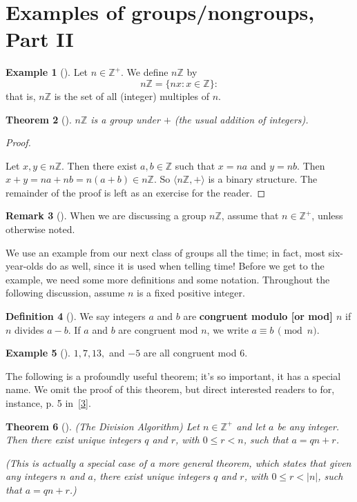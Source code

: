 \documentclass[10pt,]{book}
\newcommand{\terminology}[1]{\textbf{#1}}
\theoremstyle{plain}
\newtheorem{theorem}{Theorem}[section]
\theoremstyle{definition}
\newtheorem{definition}[theorem]{Definition}
\theoremstyle{definition}
\newtheorem{remark}[theorem]{Remark}
\theoremstyle{definition}
\newtheorem{example}[theorem]{Example}
\theoremstyle{definition}
\numberwithin{equation}{section}
\def\Z{\mathbb{Z}}
\newcommand{\lt}{<}
\begin{document}
\section[{Examples of groups/nongroups, Part II}]{Examples of groups/nongroups, Part II}\label{section-8}
\begin{example}[]\label{example-14}
Let \(n\in \Z^+\). We define \(n\Z\) by%
\begin{equation*}
n\Z=\{nx: x\in \Z\}:
\end{equation*}
that is, \(n\Z\) is the set of all (integer) multiples of \(n\).%
\end{example}
\begin{theorem}[{}]\label{nz}
\(n\Z\) is a group under \(+\) (the usual addition of integers).%
\end{theorem}
\begin{proof}\hypertarget{proof-13}{}
Let \(x, y\in n\Z\). Then there exist \(a,b\in \Z\) such that \(x=na\) and \(y=nb\). Then \(x+y=na+nb=n(a+b)\in n\Z\). So \(\langle n\Z,+\rangle\) is a binary structure. The remainder of the proof is left as an exercise for the reader.%
\end{proof}
\begin{remark}[]\label{remark-12}
When we are discussing a group \(n\Z\), assume that \(n\in \Z^+\), unless otherwise noted.%
\end{remark}
We use an example from our next class of groups all the time; in fact, most six-year-olds do as well, since it is used when telling time! Before we get to the example, we need some more definitions and some notation. Throughout the following discussion, assume \(n\) is a fixed positive integer.%
\begin{definition}[{}]\label{definition-23}
We say integers \(a\) and \(b\) are \terminology{congruent modulo [or mod] \(n\)} if \(n\) divides \(a-b\). If \(a\) and \(b\) are congruent mod \(n\), we write \(a \equiv b\, \pmod{n}\).%
\end{definition}
\begin{example}[]\label{cong_ex}
\(1, 7, 13,\) and \(-5\) are all congruent mod \(6\).%
\end{example}
The following is a profoundly useful theorem; it's so important, it has a special name. We omit the proof of this theorem, but direct interested readers to for, instance, p. 5 in~\hyperlink{NZM}{[3]}.%
\begin{theorem}[{}]\label{theorem-14}
(The Division Algorithm) Let \(n\in \Z^+\) and let \(a\) be any integer. Then there exist unique integers \(q\) and \(r\), with \(0\leq
r \lt n\), such that \(a=qn+r\).%
\par
(This is actually a special case of a more general theorem, which states that given any integers \(n\) and \(a\), there exist unique integers \(q\) and \(r\), with \(0\leq
r\lt |n|\), such that \(a=qn+r\).)%
\end{theorem}
\end{document}
